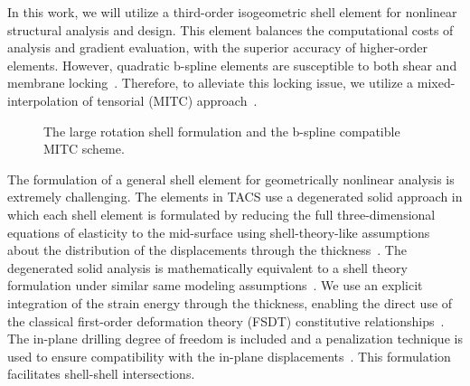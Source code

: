 \documentclass[]{aiaa-tc}
\begin{document}
In this work, we will utilize a third-order isogeometric shell element
for nonlinear structural analysis and design.  This element balances
the computational costs of analysis and gradient evaluation, with the
superior accuracy of higher-order elements. However, quadratic
b-spline elements are susceptible to both shear and membrane
locking~\cite{Babuska:1992:OLR, Chapelle.Bathe}. Therefore, to
alleviate this locking issue, we utilize a mixed-interpolation of
tensorial (MITC) approach~\cite{Dvorkin:1984:CMB, Bucalem:1993:HOM}.

\begin{figure}[h]
  \centering
  \caption{The large rotation shell formulation and the b-spline
    compatible MITC scheme.}
  \label{fig:shell-figs}
\end{figure}

The formulation of a general shell element for geometrically nonlinear
analysis is extremely challenging. The elements in TACS use a
degenerated solid approach in which each shell element is formulated
by reducing the full three-dimensional equations of elasticity to the
mid-surface using shell-theory-like assumptions about the distribution
of the displacements through the thickness~\cite{Ahmad:1970:ATS,
  Bathe:1980:GMN, Parisch:1978:GNA, Hughes:1981:NFE}.  The degenerated
solid analysis is mathematically equivalent to a shell theory
formulation under similar same modeling
assumptions~\cite{Buechter:1992:STD}.  We use an explicit integration
of the strain energy through the thickness, enabling the direct use of
the classical first-order deformation theory (FSDT) constitutive
relationships~\cite{Milford:1986:DIF, Buechter:1992:STD}. The
in-plane drilling degree of freedom is included and a penalization
technique is used to ensure compatibility with the in-plane
displacements~\cite{Hughes:1989:DDF, Simo:1992:FFE,
  Fox:1992:DRF}. This formulation facilitates shell-shell
intersections.
\end{document}
